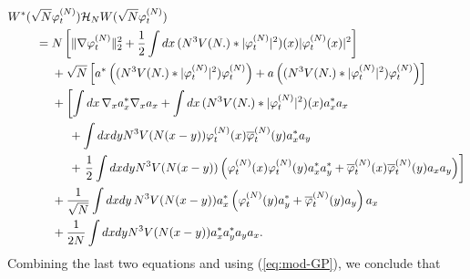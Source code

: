 \documentclass[11pt,a4paper]{article}
\newcommand{\cH}{{\cal H}}
\begin{document}
 \[ \begin{split} W^* (\sqrt{N} &\varphi_t^{(N)}) \cH_N W (\sqrt{N} \varphi_t^{(N)})  \\
= \; & N \left[ \| \nabla \varphi_t^{(N)} \|_2^2 + \frac{1}{2} \int dx \, (N^3 V (N .) * |\varphi_t^{(N)}|^2) (x) |\varphi_t^{(N)} (x)|^2 \right] \\
&+ \sqrt{N} \left[  a^*\left( (N^3 V (N.) *| \varphi_t^{(N)}|^2) \varphi_t^{(N)} \right) + a\left( (N^3 V (N.) *| \varphi_t^{(N)}|^2) \varphi_t^{(N)} \right) \right] \\
&+ \left[ \int dx \, \nabla_x a_x^* \nabla_x a_x + \int dx \, (N^3 V (N.) * |\varphi_t^{(N)}|^2) (x) a_x^* a_x \right. \\ 
&\hspace{.5cm}+ \int dx dy N^3 V(N (x-y)) \varphi_t^{(N)} (x) \overline{\varphi}_t^{(N)} (y) a_x^* a_y \\
&\hspace{.5cm}+ \left.  \frac{1}{2} \int dx dy N^3 V(N (x-y)) \left( \varphi_t^{(N)} (x) \varphi_t^{(N)} (y) a_x^* a_y^* + 
\overline{\varphi}_t^{(N)} (x) \overline{\varphi}_t^{(N)} (y) a_x a_y \right) \right] \\
&+ \frac{1}{\sqrt{N}} \int dx dy \, N^3 V(N(x-y)) a_x^* \left( \varphi_t^{(N)} (y) a_y^* + \overline{\varphi}_t^{(N)} (y) a_y \right) a_x \\
&+\frac{1}{2N} \int dx dy N^3 V(N (x-y)) a_x^* a_y^* a_y a_x. \end{split} \]
Combining the last two equations and using (\ref{eq:mod-GP}), we conclude that
\end{document}

